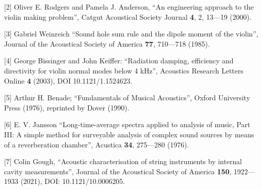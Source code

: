   [2] Oliver E. Rodgers and Pamela J. Anderson, “An engineering approach to the 
  violin making problem”, Catgut Acoustical Society Journal \textbf{4}, 2, 
  13—19 (2000). 

  [3] Gabriel Weinreich “Sound hole sum rule and the dipole moment of the 
  violin”, Journal of the Acoustical Society of America \textbf{77}, 710—718 
  (1985). 

  [4] George Bissinger and John Keiffer: “Radiation damping, efficiency and 
  directivity for violin normal modes below 4 kHz”, Acoustics Research Letters 
  Online \textbf{4} (2003), DOI 10.1121/1.1524623. 

  [5] Arthur H. Benade; “Fundamentals of Musical Acoustics”, Oxford University 
  Press (1976), reprinted by Dover (1990). 

  [6] E. V. Jansson “Long-time-average spectra applied to analysis of music, 
  Part III: A simple method for surveyable analysis of complex sound sources by 
  means of a reverberation chamber”, Acustica \textbf{34}, 275—280 (1976). 

  [7] Colin Gough, “Acoustic characterisation of string instruments by internal 
  cavity measurements”, Journal of the Acoustical Society of America 
  \textbf{150}, 1922—1933 (2021), DOI: 10.1121/10.0006205. 